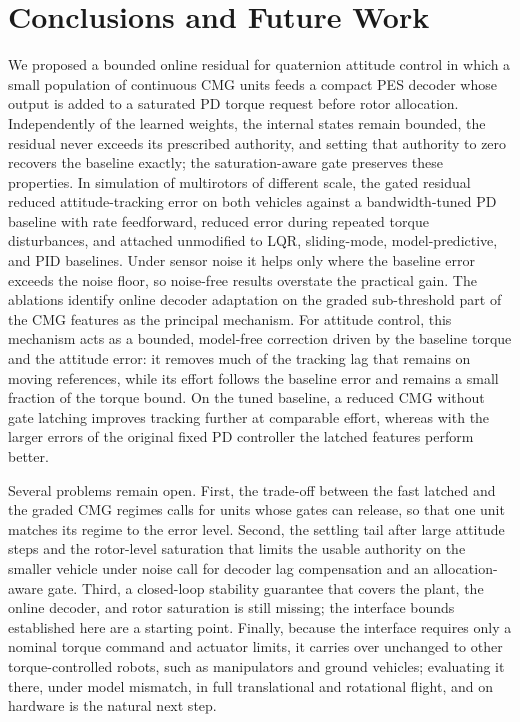 \documentclass[letterpaper, 10 pt, conference]{ieeeconf}
\begin{document}

\section{Conclusions and Future Work}
\label{sec:conclusion}

We proposed a bounded online residual for quaternion attitude control in which a small population of continuous CMG units feeds a compact PES decoder whose output is added to a saturated PD torque request before rotor allocation. Independently of the learned weights, the internal states remain bounded, the residual never exceeds its prescribed authority, and setting that authority to zero recovers the baseline exactly; the saturation-aware gate preserves these properties. In simulation of multirotors of different scale, the gated residual reduced attitude-tracking error on both vehicles against a bandwidth-tuned PD baseline with rate feedforward, reduced error during repeated torque disturbances, and attached unmodified to LQR, sliding-mode, model-predictive, and PID baselines. Under sensor noise it helps only where the baseline error exceeds the noise floor, so noise-free results overstate the practical gain. The ablations identify online decoder adaptation on the graded sub-threshold part of the CMG features as the principal mechanism. For attitude control, this mechanism acts as a bounded, model-free correction driven by the baseline torque and the attitude error: it removes much of the tracking lag that remains on moving references, while its effort follows the baseline error and remains a small fraction of the torque bound. On the tuned baseline, a reduced CMG without gate latching improves tracking further at comparable effort, whereas with the larger errors of the original fixed PD controller the latched features perform better.

Several problems remain open. First, the trade-off between the fast latched and the graded CMG regimes calls for units whose gates can release, so that one unit matches its regime to the error level. Second, the settling tail after large attitude steps and the rotor-level saturation that limits the usable authority on the smaller vehicle under noise call for decoder lag compensation and an allocation-aware gate. Third, a closed-loop stability guarantee that covers the plant, the online decoder, and rotor saturation is still missing; the interface bounds established here are a starting point. Finally, because the interface requires only a nominal torque command and actuator limits, it carries over unchanged to other torque-controlled robots, such as manipulators and ground vehicles; evaluating it there, under model mismatch, in full translational and rotational flight, and on hardware is the natural next step.



\end{document}
